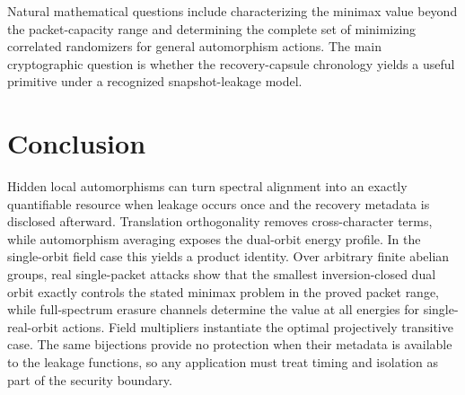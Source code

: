 \documentclass[11pt]{article}
\theoremstyle{definition}
\begin{document}
Natural mathematical questions include characterizing the minimax value beyond
the packet-capacity range and determining the complete set of
minimizing correlated randomizers for general automorphism actions.  The main
cryptographic question is whether the recovery-capsule chronology yields a useful
primitive under a recognized snapshot-leakage model.

\section{Conclusion}

Hidden local automorphisms can turn spectral alignment into an exactly
quantifiable resource when leakage occurs once and the recovery metadata is
disclosed afterward.  Translation orthogonality removes cross-character terms,
while automorphism averaging exposes the dual-orbit energy profile.  In the
single-orbit field case this yields a product identity.  Over arbitrary finite
abelian groups, real single-packet attacks show that the smallest
inversion-closed dual orbit exactly controls the stated minimax problem in the
proved packet range, while full-spectrum erasure channels determine the value at
all energies for single-real-orbit actions.  Field multipliers instantiate the
optimal projectively transitive case.  The same bijections provide no protection when
their metadata is available to the leakage functions, so any application must
treat timing and isolation as part of the security boundary.



\end{document}

